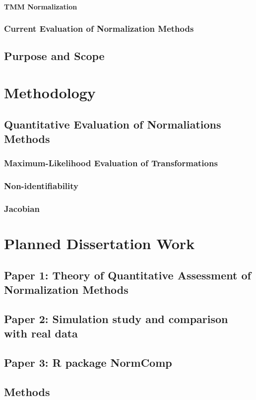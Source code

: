 \documentclass{book}\usepackage[]{graphicx}\usepackage[]{color}
\begin{document}
\subsubsection{TMM Normalization}



\subsection{Current Evaluation of Normalization Methods}

\section{Purpose and Scope}

\chapter{Methodology}

\section{Quantitative Evaluation of Normaliations Methods}

\subsection{Maximum-Likelihood Evaluation of Transformations}

\subsection{Non-identifiability}

\subsection{Jacobian}

\chapter{Planned Dissertation Work}

\section{Paper 1:  Theory of Quantitative Assessment of Normalization Methods}

\section{Paper 2:  Simulation study and comparison with real data}

\section{Paper 3:  R package NormComp}



\section{Methods}
\end{document}
